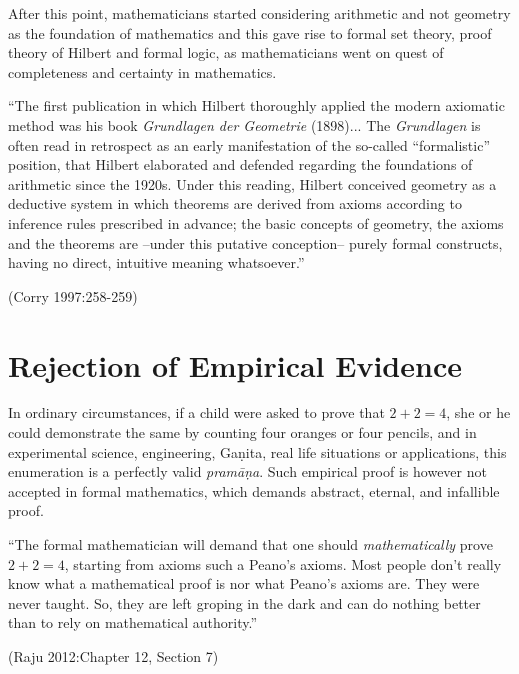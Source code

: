 After this point, mathematicians started considering arithmetic and not geometry as the foundation of mathematics and this gave rise to formal set theory, proof theory of Hilbert and formal logic, as mathematicians went on quest of completeness and certainty in mathematics.
\begin{myquote}
``The first publication in which Hilbert thoroughly applied the modern axiomatic method was his book {\sl Grundlagen der Geometrie} (1898)... The {\sl Grundlagen} is often read in retrospect as an early manifestation of the so-called ``formalistic'' position, that Hilbert elaborated and defended regarding the foundations of arithmetic since the 1920s. Under this reading, Hilbert conceived geometry as a deductive system in which theorems are derived from axioms according to inference rules prescribed in advance; the basic concepts of geometry, the axioms and the theorems are --under this putative conception-- purely formal constructs, having no direct, intuitive meaning whatsoever.'' 

\hfill (Corry 1997:258-259)
\end{myquote}

\section*{Rejection of Empirical Evidence}

In ordinary circumstances, if a child were asked to prove that $2 + 2 = 4$, she or he could demonstrate the same by counting four oranges or four pencils, and in experimental science, engineering, Gaṇita, real life situations or applications, this enumeration is a perfectly valid {\sl pramāṇa}. Such empirical proof is however not accepted in formal mathematics, which demands abstract, eternal, and infallible proof.
\begin{myquote}
``The formal mathematician will demand that one should {\sl mathematically} prove $2 + 2 = 4$, starting from axioms such a Peano’s axioms. Most people don’t really know what a mathematical proof is nor what Peano’s axioms are. They were never taught. So, they are left groping in the dark and can do nothing better than to rely on mathematical authority.''

\hfill (Raju 2012:Chapter 12, Section 7)
\end{myquote}

